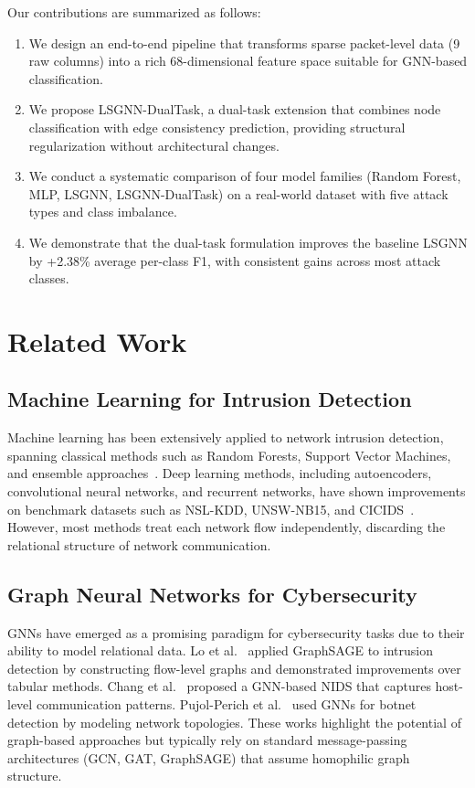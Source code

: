 \documentclass[conference]{IEEEtran}
\begin{document}
Our contributions are summarized as follows:
\begin{enumerate}
    \item We design an end-to-end pipeline that transforms sparse packet-level data (9 raw columns) into a rich 68-dimensional feature space suitable for GNN-based classification.
    \item We propose LSGNN-DualTask, a dual-task extension that combines node classification with edge consistency prediction, providing structural regularization without architectural changes.
    \item We conduct a systematic comparison of four model families (Random Forest, MLP, LSGNN, LSGNN-DualTask) on a real-world dataset with five attack types and class imbalance.
    \item We demonstrate that the dual-task formulation improves the baseline LSGNN by +2.38\% average per-class F1, with consistent gains across most attack classes.
\end{enumerate}

\section{Related Work}

\subsection{Machine Learning for Intrusion Detection}

Machine learning has been extensively applied to network intrusion detection, spanning classical methods such as Random Forests, Support Vector Machines, and ensemble approaches~\cite{buczak2016survey}. Deep learning methods, including autoencoders, convolutional neural networks, and recurrent networks, have shown improvements on benchmark datasets such as NSL-KDD, UNSW-NB15, and CICIDS~\cite{ahmad2021network, ferrag2020deep}. However, most methods treat each network flow independently, discarding the relational structure of network communication.

\subsection{Graph Neural Networks for Cybersecurity}

GNNs have emerged as a promising paradigm for cybersecurity tasks due to their ability to model relational data. Lo et al.~\cite{lo2022graphsage_ids} applied GraphSAGE to intrusion detection by constructing flow-level graphs and demonstrated improvements over tabular methods. Chang et al.~\cite{chang2021gnn_nids} proposed a GNN-based NIDS that captures host-level communication patterns. Pujol-Perich et al.~\cite{pujol2022unveiling} used GNNs for botnet detection by modeling network topologies. These works highlight the potential of graph-based approaches but typically rely on standard message-passing architectures (GCN, GAT, GraphSAGE) that assume homophilic graph structure.
\end{document}
